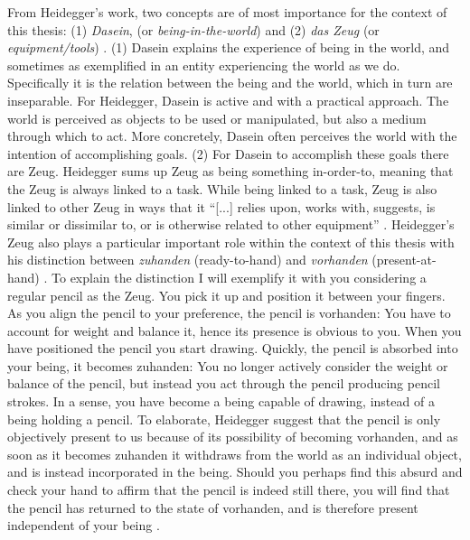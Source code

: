 From Heidegger's work, two concepts are of most importance for the context of this thesis: (1) \textit{Dasein}, (or \textit{being-in-the-world}) and (2) \textit{das Zeug} (or \textit{equipment/tools}) \cite{heidegger}.
(1) Dasein explains the experience of being in the world, and sometimes as exemplified in an entity experiencing the world as we do. Specifically it is the relation between the being and the world, which in turn are inseparable. For Heidegger, Dasein is active and with a practical approach. The world is perceived as objects to be used or manipulated, but also a medium through which to act. More concretely, Dasein often perceives the world with the intention of accomplishing goals.
(2) For Dasein to accomplish these goals there are Zeug. Heidegger sums up Zeug as being something in-order-to, meaning that the Zeug is always linked to a task. While being linked to a task, Zeug is also linked to other Zeug in ways that it ``[...] relies upon, works with, suggests, is similar or dissimilar to, or is otherwise related to other equipment'' \cite[p. 109]{dourish}. Heidegger's Zeug also plays a particular important role within the context of this thesis with his distinction between \textit{zuhanden} (ready-to-hand) and \textit{vorhanden} (present-at-hand) \cite{heidegger}. To explain the distinction I will exemplify it with you considering a regular pencil as the Zeug. You pick it up and position it between your fingers. As you align the pencil to your preference, the pencil is vorhanden: You have to account for weight and balance it, hence its presence is obvious to you. When you have positioned the pencil you start drawing. Quickly, the pencil is absorbed into your being, it becomes zuhanden: You no longer actively consider the weight or balance of the pencil, but instead you act through the pencil producing pencil strokes. In a sense, you have become a being capable of drawing, instead of a being holding a pencil. To elaborate, Heidegger suggest that the pencil is only objectively present to us because of its possibility of becoming vorhanden, and as soon as it becomes zuhanden it withdraws from the world as an individual object, and is instead incorporated in the being. Should you perhaps find this absurd and check your hand to affirm that the pencil is indeed still there, you will find that the pencil has returned to the state of vorhanden, and is therefore present independent of your being \cite{dourish}.

